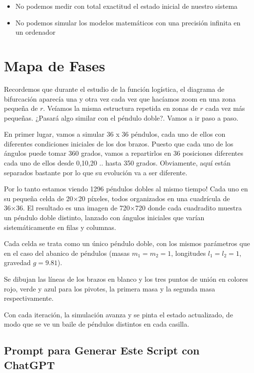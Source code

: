 \documentclass[
  10pt,
  a4paper,
  DIV=11,
  numbers=noendperiod,
  open=any]{scrreprt}
\providecommand{\tightlist}{%
  \setlength{\itemsep}{0pt}\setlength{\parskip}{0pt}}
\numberwithin{equation}{chapter}
\numberwithin{equation}{section}
\renewcommand{\[}{\begin{equation}}
\renewcommand{\]}{\end{equation}}
\begin{document}
\begin{itemize}
\tightlist
\item
  No podemos medir con total exactitud el estado inicial de nuestro
  sistema
\item
  No podemos simular los modelos matemáticos con una precisión infinita
  en un ordenador
\end{itemize}

\chapter{Mapa de Fases}\label{mapa-de-fases}

Recordemos que durante el estudio de la función logística, el diagrama
de bifurcación aparecía una y otra vez cada vez que hacíamos zoom en una
zona pequeña de \(r\). Veíamos la misma estructura repetida en zonas de
\(r\) cada vez más pequeñas. ¿Pasará algo similar con el péndulo doble?.
Vamos a ir paso a paso.

En primer lugar, vamos a simular 36 x 36 péndulos, cada uno de ellos con
diferentes condiciones iniciales de los dos brazos. Puesto que cada uno
de los ángulos puede tomar 360 grados, vamos a repartirlos en 36
posiciones diferentes cada uno de ellos desde 0,10,20 .. hasta 350
grados. Obviamente, aquí están separados bastante por lo que su
evolución va a ser diferente.

Por lo tanto estamos viendo 1296 péndulos dobles al mismo tiempo! Cada
uno en su pequeña celda de 20×20 píxeles, todos organizados en una
cuadrícula de 36×36. El resultado es una imagen de 720×720 donde cada
cuadradito muestra un péndulo doble distinto, lanzado con ángulos
iniciales que varían sistemáticamente en filas y columnas.

Cada celda se trata como un único péndulo doble, con los mismos
parámetros que en el caso del abanico de péndulos (masas \(m_1=m_2=1\),
longitudes \(l_1=l_2=1\), gravedad \(g=9.81\)).

Se dibujan las líneas de los brazos en blanco y los tres puntos de unión
en colores rojo, verde y azul para los pivotes, la primera masa y la
segunda masa respectivamente.

Con cada iteración, la simulación avanza y se pinta el estado
actualizado, de modo que se ve un baile de péndulos distintos en cada
casilla.

\section{Prompt para Generar Este Script con
ChatGPT}\label{prompt-para-generar-este-script-con-chatgpt}
\end{document}
